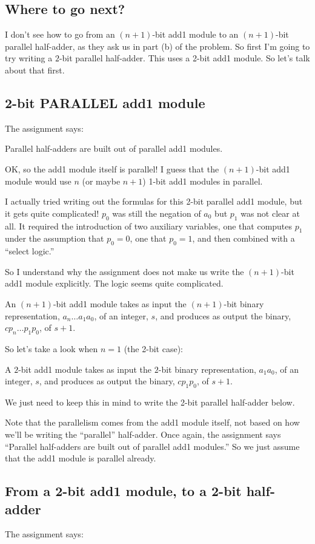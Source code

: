 \documentclass[14pt]{extarticle}
\begin{document}
\subsection{Where to go next?}
I don't see how to go from an $(n+1)$-bit add1 module to an $(n+1)$-bit parallel half-adder, as they ask us in part (b) of the problem. So first I'm going to try writing a $2$-bit parallel half-adder. This uses a 2-bit add1 module. So let's talk about that first.

\subsection{2-bit PARALLEL add1 module}
The assignment says:

Parallel half-adders are built out of parallel add1 modules.

OK, so the add1 module itself is parallel! I guess that the $(n+1)$-bit add1 module would use $n$ (or maybe $n+1$) 1-bit add1 modules in parallel.

I actually tried writing out the formulas for this 2-bit parallel add1 module, but it gets quite complicated! $p_0$ was still the negation of $a_0$ but $p_1$ was not clear at all. It required the introduction of two auxiliary variables, one that computes $p_1$ under the assumption that $p_0 = 0$, one that $p_0 = 1$, and then combined with a ``select logic.'' 

So I understand why the assignment does not make us write the $(n+1)$-bit add1 module explicitly. The logic seems quite complicated.

An $(n+1)$-bit add1 module takes as in­put the $(n+1)$-bit binary representation, $a_n \ldots a_1a_0$, of an integer, $s$, and produces as output the binary, $cp_n\ldots p_1p_0$, of $s + 1$.

So let's take a look when $n = 1$ (the 2-bit case):

A $2$-bit add1 module takes as in­put the $2$-bit binary representation, $a_1a_0$, of an integer, $s$, and produces as output the binary, $c p_1p_0$, of $s + 1$.

We just need to keep this in mind to write the 2-bit parallel half-adder below. 

Note that the parallelism comes from the add1 module itself, not based on how we'll be writing the ``parallel'' half-adder. Once again, the assignment says ``Parallel half-adders are built out of parallel add1 modules.'' So we just assume that the add1 module is parallel already.

\subsection{From a 2-bit add1 module, to a 2-bit half-adder}
The assignment says:
\end{document}
